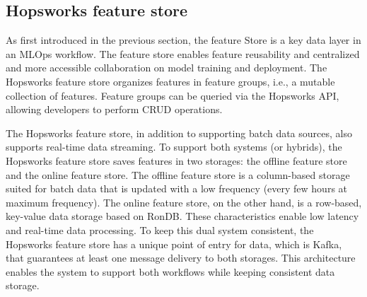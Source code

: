 \subsection{Hopsworks feature store}

As first introduced in the previous section, the feature Store is a key data layer in an \gls{MLOps} workflow. The feature store enables feature reusability and centralized and more accessible collaboration on model training and deployment. The Hopsworks feature store organizes features in feature groups, i.e., a mutable collection of features. Feature groups can be queried via the Hopsworks \gls{API}, allowing developers to perform \gls{CRUD} operations.

The Hopsworks feature store, in addition to supporting batch data sources, also supports real-time data streaming. To support both systems (or hybrids), the Hopsworks feature store saves features in two storages: the offline feature store and the online feature store. The offline feature store is a column-based storage suited for batch data that is updated with a low frequency (every few hours at maximum frequency). The online feature store, on the other hand, is a row-based, key-value data storage based on RonDB. These characteristics enable low latency and real-time data processing. To keep this dual system consistent, the Hopsworks feature store has a unique point of entry for data, which is Kafka, that guarantees at least one message delivery to both storages. This architecture enables the system to support both workflows while keeping consistent data storage.
